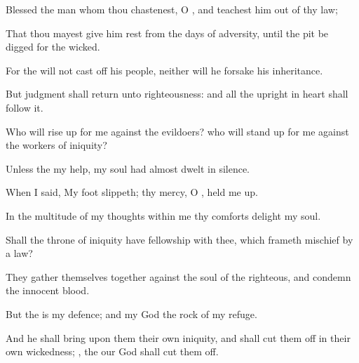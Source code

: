 {\Q {}Blessed
{} the
man whom thou
chastenest, O
{}, and
teachest him out of thy
law;


\par }{\Q {}That thou mayest give him
rest from the
days of
adversity, until the
pit be
digged for the
wicked.


\par }{\Q {}For the
{} will not cast
off his
people, neither will he
forsake his
inheritance.


\par }{\Q {}But
judgment shall
return unto
righteousness: and all the
upright in
heart shall
follow it.


\par }{\Q {}Who will rise
up for me against the
evildoers?
{} who will stand
up for me against the
workers of
iniquity?


\par }{\Q {}Unless the
{}
{} my
help, my
soul had
almost
dwelt in
silence.


\par }{\Q {}When I
said, My
foot
slippeth; thy
mercy, O
{}, held me
up.


\par }{\Q {}In the
multitude of my
thoughts
within me thy
comforts
delight my
soul.


\par }{\Q {}Shall the
throne of
iniquity have
fellowship with thee, which
frameth
mischief by a
law?


\par }{\Q {}They gather themselves
together against the
soul of the
righteous, and
condemn the
innocent
blood.


\par }{\Q {}But the
{} is my
defence; and my
God
{} the
rock of my
refuge.


\par }{\Q {}And he shall
bring upon them their own
iniquity, and shall cut them
off in their own
wickedness;
{}, the
{} our
God shall cut them
off.




\par }

